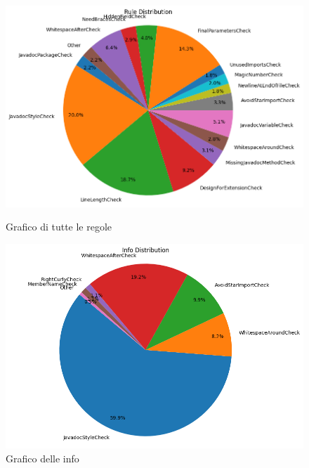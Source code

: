 \begin{figure}[H]
	\centering
	\begin{minipage}[b]{1\textwidth}
		\centering
		\includegraphics[width=\textwidth]{iterazione1/images/cliente-error_distribution_pie_chart.png}
		\caption{Grafico di tutte le regole}
		\label{fig:cliente-error_distribution_pie_chart}
	\end{minipage}
	\hfill
	\begin{minipage}[b]{0.45\textwidth}
		\centering
		\includegraphics[width=\textwidth]{iterazione1/images/cliente-info_severity_distribution_pie_chart.png}
		\caption{Grafico delle info}
		\label{fig:cliente-info_severity_distribution_pie_chart}
	\end{minipage}
	\vspace{0.5cm}
	\begin{minipage}[b]{0.45\textwidth}
		\centering

\end{minipage}
\end{figure}
